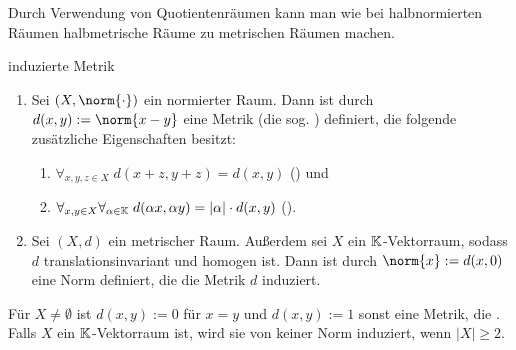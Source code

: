 \begin{Bem}
    Durch Verwendung von Quotientenräumen kann man wie bei halbnormierten Räumen
    halbmetrische Räume zu metrischen Räumen machen.
\end{Bem}

\begin{Satz}{induzierte Metrik}
    \begin{enumerate}
        \item
        Sei $(X, \norm{\cdot})$ ein normierter Raum.
        Dann ist durch $d(x, y) := \norm{x - y}$ eine Metrik
        (die sog. ) definiert,
        die folgende zusätzliche Eigenschaften besitzt:
        \begin{enumerate}[start=4]
            \item
            $\forall_{x, y, z \in X}\; d(x + z, y + z) = d(x, y)$
            () und
            
            \item
            $\forall_{x, y \in X} \forall_{\alpha \in \mathbb{K}}\;
            d(\alpha x, \alpha y) = |\alpha| \cdot d(x, y)$
            ().
        \end{enumerate}
        
        \item
        Sei $(X, d)$ ein metrischer Raum.
        Außerdem sei $X$ ein $\mathbb{K}$-Vektorraum, sodass
        $d$ translationsinvariant und homogen ist.
        Dann ist durch $\norm{x} := d(x, 0)$ eine Norm definiert,
        die die Metrik $d$ induziert.
    \end{enumerate}
\end{Satz}

\begin{Bsp}
    Für $X \not= \emptyset$ ist $d(x, y) := 0$ für $x = y$ und $d(x, y) := 1$ sonst
    eine Metrik, die .
    Falls $X$ ein $\mathbb{K}$-Vektorraum ist, wird sie von keiner Norm induziert, wenn $|X| \ge 2$.
\end{Bsp}

\pagebreak

